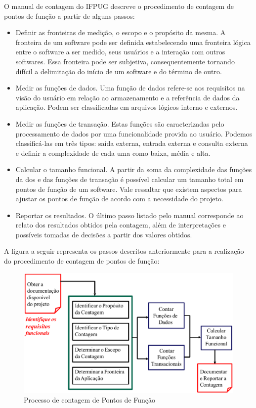 O manual de contagem do IFPUG descreve o procedimento de contagem de pontos de função a partir de alguns passos: \cite{IFPUG:2010}

\begin{itemize}

\item Definir as fronteiras de medição, o escopo e o propósito da mesma. A fronteira de um software pode ser definida estabelecendo uma fronteira lógica entre o software a ser medido, seus usuários e a interação com outros softwares. Essa fronteira pode ser subjetiva, consequentemente tornando difícil a delimitação do início de um software e do término de outro. \cite{Marcos:2015}

\item Medir as funções de dados. Uma função de dados refere-se aos requisitos na visão do usuário em relação ao armazenamento e a referência de dados da aplicação. Podem ser classificadas em arquivos lógicos interno e externos.

\item Medir as funções de transação. Estas funções são caracterizadas pelo processamento de dados por uma funcionalidade provida ao usuário. Podemos classificá-las em três tipos: saída externa, entrada externa e consulta externa e definir a complexidade de cada uma como baixa, média e alta.

\item Calcular o tamanho funcional. A partir da soma da complexidade das funções da dos e das funções de transação é possível calcular um tamanho total em pontos de função de um software. Vale ressaltar que existem aspectos para ajustar os pontos de função de acordo com a necessidade do projeto.

\item Reportar os resultados. O último passo listado pelo manual corresponde ao relato dos resultados obtidos pela contagem, além de interpretações e possíveis tomadas de decisões a partir dos valores obtidos.

\end{itemize}

A figura a seguir representa os passos descritos anteriormente para a realização do procedimento de contagem de pontos de função:

\begin{figure}[h]
	\centering
	\label{fig05}
		\includegraphics[keepaspectratio=true,scale=0.4]{figuras/fig05.eps}
	\caption{Processo de contagem de Pontos de Função \cite{SISP:2016}}
\end{figure}


